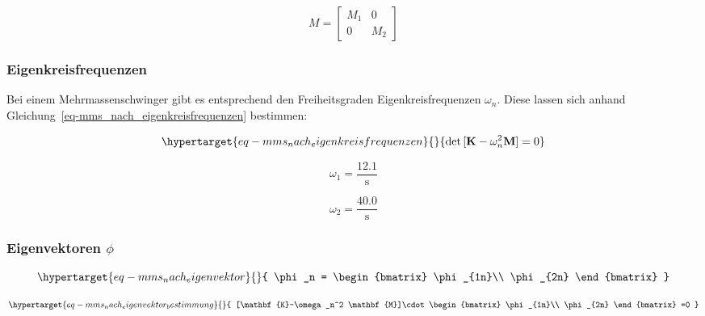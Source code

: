 \documentclass[
  letterpaper,
  DIV=11]{scrreprt}
\begin{document}
\begin{equation}M = \left[\begin{matrix}M_{1} & 0\\0 & M_{2}\end{matrix}\right]\end{equation}

\hypertarget{eigenkreisfrequenzen-2}{%
\subsubsection{Eigenkreisfrequenzen}\label{eigenkreisfrequenzen-2}}

Bei einem Mehrmassenschwinger gibt es entsprechend den Freiheitsgraden
Eigenkreisfrequenzen \(\omega_n\). Diese lassen sich anhand
Gleichung~\ref{eq-mms_nach_eigenkreisfrequenzen} bestimmen:

\begin{equation}\protect\hypertarget{eq-mms_nach_eigenkreisfrequenzen}{}{
\det{[\mathbf{K}-\omega_n^2 \mathbf{M}]=0}
}\label{eq-mms_nach_eigenkreisfrequenzen}\end{equation}

\begin{equation}\omega_{1} = \frac{12.1}{\text{s}}\end{equation}

\begin{equation}\omega_{2} = \frac{40.0}{\text{s}}\end{equation}

\hypertarget{eigenvektoren-phi-1}{%
\subsubsection{\texorpdfstring{Eigenvektoren
\(\phi\)}{Eigenvektoren \textbackslash phi}}\label{eigenvektoren-phi-1}}

\begin{equation}\protect\hypertarget{eq-mms_nach_eigenvektor}{}{
\phi_n = \begin{bmatrix}
\phi_{1n}\\
\phi_{2n} 
\end{bmatrix}
}\label{eq-mms_nach_eigenvektor}\end{equation}

\begin{equation}\protect\hypertarget{eq-mms_nach_eigenvektor_bestimmung}{}{
[\mathbf{K}-\omega_n^2 \mathbf{M}]\cdot \begin{bmatrix}
\phi_{1n}\\
\phi_{2n} 
\end{bmatrix}
=0
}\label{eq-mms_nach_eigenvektor_bestimmung}\end{equation}
\end{document}
